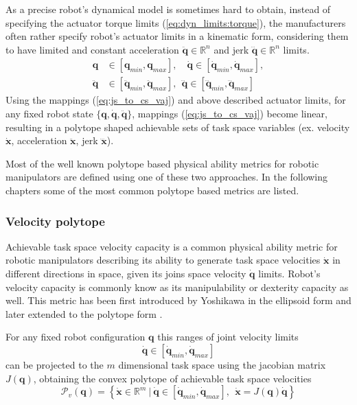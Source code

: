 As a precise robot's dynamical model is sometimes hard to obtain, instead of specifying the actuator torque limits (\ref{eq:dyn_limits:torque}), the manufacturers often rather specify robot's actuator limits in a kinematic form, considering them to have limited and constant acceleration $\ddot{\bm{q}} \in \mathbb{R}^n$ and jerk $\dddot{\bm{q}} \in \mathbb{R}^n$ limits.
\begin{subequations}
\begin{align}
\bm{q} &\in [\bm{q}_{min},  \bm{q}_{max}],\quad\dot{\bm{q}} \in [\dot{\bm{q}}_{min},  \dot{\bm{q}}_{max}],\\
\ddot{\bm{q}} &\in [\ddot{\bm{q}}_{min}, \ddot{\bm{q}}_{max}], ~~ \dddot{\bm{q}} \in [ \dddot{\bm{q}}_{min}, \dddot{\bm{q}}_{max}] 
\end{align}
\label{eq:kin_limits}
\end{subequations}
Using the mappings (\ref{eq:js_to_cs_vaj}) and above described actuator limits, for any fixed robot state $\{\bm{q},\dot{\bm{q}},\ddot{\bm{q}}\}$, mappings (\ref{eq:js_to_cs_vaj}) become linear, resulting in  a polytope shaped achievable sets of task space variables (ex. velocity $\dot{\bm{x}}$, acceleration $\ddot{\bm{x}}$, jerk $\dddot{\bm{x}}$). 

Most of the well known polytope based physical ability metrics for robotic manipulators are defined using one of these two approaches. In the following chapters some of the most common polytope based metrics are listed.

\subsubsection{Velocity polytope}
\label{ch:vel_poly}

Achievable task space velocity capacity is a common physical ability metric for robotic manipulators describing its ability to generate task space velocities $\dot{\bm{x}}$ in different directions in space, given its joins space velocity $\dot{\bm{q}}$ limits. Robot's velocity capacity is commonly know as its manipulability or dexterity capacity as well. This metric has been first introduced by Yoshikawa \cite{yoshikawa_manipulability_1985} in the ellipsoid form and later extended to the polytope form \cite{chiacchio_global_1991, Lee1997manip}. %

For any fixed robot configuration $\bm{q}$ this ranges of joint velocity limits 
\begin{equation}
   \dot{\bm{q}}\in\left[\dot{\bm{q}}_{min}, \dot{\bm{q}}_{max} \right]
\end{equation}
can be projected to the $m$ dimensional task space using the jacobian matrix $J(\bm{q})$, obtaining the convex polytope of achievable task space velocities  
\begin{equation}
    \mathcal{P}_v(\bm{q}) = \left\{ \dot{\bm{x}} \in \mathbb{R}^m ~|~ \dot{\bm{q}}\in\left[\dot{\bm{q}}_{min}, \dot{\bm{q}}_{max} \right], ~~ \dot{\bm{x}} = J(\bm{q})\dot{\bm{q}} \right\}
\end{equation}

